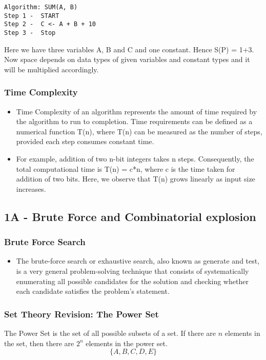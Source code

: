 \documentclass{beamer}
\begin{document}
\begin{frame}[fragile]
	\begin{verbatim}
Algorithm: SUM(A, B)
Step 1 -  START
Step 2 -  C <- A + B + 10
Step 3 -  Stop
\end{verbatim}
Here we have three variables A, B and C and one constant. 
Hence S(P) = 1+3. Now space depends on data types of given variables and constant types and it will be multiplied accordingly.
\end{frame}
\begin{frame}
\frametitle{Time Complexity}
\begin{itemize}
\item Time Complexity of an algorithm represents the amount of time required by the algorithm to run to completion. Time requirements can be defined as a numerical function T(n), where T(n) can be measured as the number of steps, provided each step consumes constant time.

\item For example, addition of two n-bit integers takes n steps. Consequently, the total computational time is T(n) = c*n, where c is the time taken for addition of two bits. Here, we observe that T(n) grows linearly as input size increases.
\end{itemize}
\end{frame}

\subsection{1A - Brute Force and Combinatorial explosion}
\begin{frame}
\frametitle{Brute Force Search}
\begin{itemize}
\item The brute-force search or exhaustive search, also known as generate and test, is a very general problem-solving technique that consists of systematically enumerating all possible candidates for the solution and checking whether each candidate satisfies the problem's statement.
\end{itemize}
\end{frame}


\begin{frame}
\frametitle{Set Theory Revision: The Power Set}
The Power Set is the set of all possible subsets of a set. If there are $n$ elements in the set, then there are $2^n$ elements in the power set.
\[ \{A,B,C,D,E\}\]
\end{frame}
\end{document}
